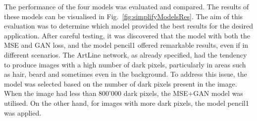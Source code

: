 \noindent The performance of the four models was evaluated and compared. The results of these models can be visualised in Fig.~\ref{fig:simplifyModelsRes}. The aim of this evaluation was to determine which model provided the best results for the desired application. After careful testing, it was discovered that the model with both the MSE and GAN loss, and the model pencil1 offered remarkable results, even if in different scenarios. The ArtLine network, as already specified, had the tendency to produce images with a high number of dark pixels, particularly in areas such as hair,  beard and sometimes even in the background. To address this issue, the model was selected based on the number of dark pixels present in the image. When the image had less than 800'000 dark pixels, the MSE+GAN model was utilised. On the other hand, for images with more dark pixels, the model pencil1 was applied.
